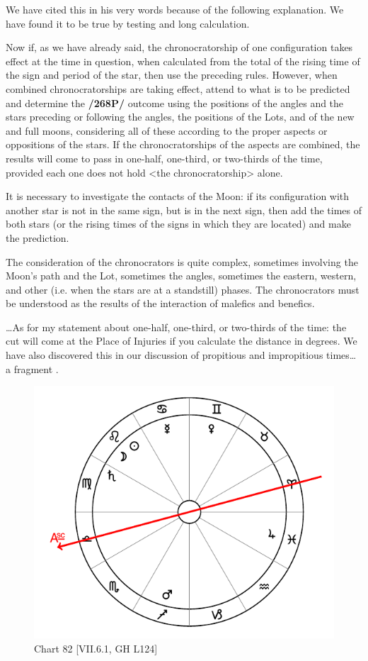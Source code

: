 We have cited this in his very words because of the following explanation. We have found it to be true by testing and long calculation.

Now if, as we have already said, the chronocratorship of one configuration takes effect at the time in question, when calculated from the total of the rising time of the sign and period of the star, then use the preceding rules. However, when combined chronocratorships are taking effect, attend to what is to be
predicted and determine the \textbf{/268P/} outcome using the positions of the angles and the stars preceding or following the angles, the positions of the Lots, and of the new and full moons, considering all of these according to the proper aspects or oppositions of the stars. 
If the chronocratorships of the aspects are combined, the results will come to pass in one-half, one-third, or two-thirds of the time, provided each one does not hold <the chronocratorship> alone.

It is necessary to investigate the contacts of the Moon: if its configuration with another star is not in the same sign, but is in the next sign, then add the times of both stars (or the rising times of the signs in which they are located) and make the prediction. 

The consideration of the chronocrators is quite complex, sometimes involving the Moon’s path and the Lot, sometimes the angles, sometimes the eastern, western, and other (i.e. when the stars are at a standstill) phases. The chronocrators must be understood as the
results of the interaction of malefics and benefics.

…As for my statement about one-half, one-third, or two-thirds of the time: the cut will come at the Place of Injuries if you calculate the distance in degrees. We have also discovered this in our discussion of
propitious and impropitious times… a fragment .

\begin{figure}
\centering
\vspace{-10pt}
\includegraphics[width=.68\textwidth]{charts/7_6_01}
\caption{Chart 82 [VII.6.1, GH L124]}
\label{fig:chart82}
\end{figure} 

